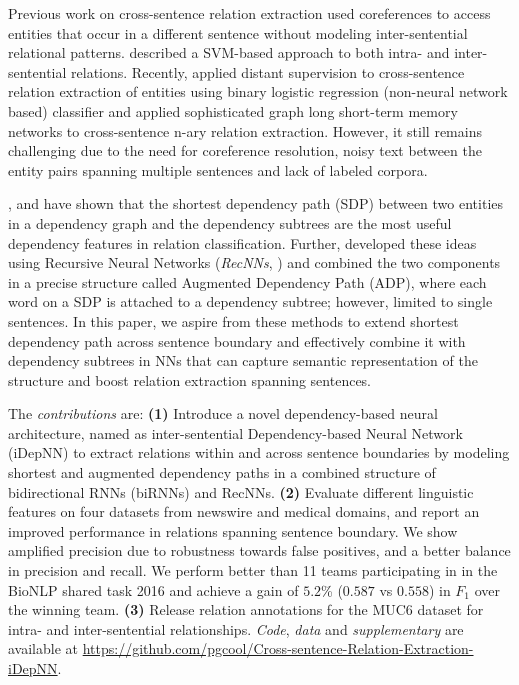 \documentclass[letterpaper]{article} \usepackage{aaai19}  \usepackage{times}  \usepackage{helvet}  \usepackage{courier}  \usepackage{url}  \usepackage{graphicx}
\def\citet#1{\citeauthor{#1} \shortcite{#1}}
\begin{document}
Previous work on cross-sentence relation extraction used
coreferences to access entities that occur in a different
sentence \cite{gerber2010beyond,yoshikawa2011coreference}
without modeling inter-sentential relational patterns. 
\citeauthor{swampillai2011extracting}  described a SVM-based
approach to both intra- and inter-sentential relations.
Recently, \citeauthor{quirk2016distant}  applied distant 
supervision to cross-sentence relation extraction of 
entities using binary logistic regression (non-neural
network based) classifier and \citeauthor{peng2017cross}  applied sophisticated graph long short-term memory networks
to cross-sentence n-ary relation extraction.  However, it
still remains challenging due to the need for coreference
resolution, noisy text between the entity pairs spanning
multiple sentences and lack of labeled corpora.




\citeauthor{bunescu2005shortest} , \citeauthor{nguyen2007relation}  and \citeauthor{mintz:82}  
have shown that the shortest dependency path (SDP)
between two entities in a dependency graph and the dependency subtrees are the most useful dependency features   
in relation classification. 
Further, \citeauthor{liu2015dependency}  developed these ideas using Recursive Neural Networks (\emph{RecNNs}, \citet{socher2014grounded}) and combined the two components in a precise structure called 
Augmented Dependency Path (ADP), where each word on a SDP is attached to a dependency subtree; however, limited to single sentences. 
In this paper, we aspire from these methods to extend shortest dependency path across sentence boundary and effectively combine it with dependency subtrees in NNs that 
can capture semantic representation of the structure and boost relation extraction spanning sentences. 


The {\it contributions} are: 
{\bf (1)} Introduce a novel dependency-based neural architecture, named as inter-sentential Dependency-based Neural Network (iDepNN) 
to extract relations within and across sentence boundaries by modeling shortest and augmented dependency paths 
in a combined structure of bidirectional RNNs (biRNNs) and RecNNs.
{\bf (2)}  Evaluate different linguistic features on four datasets from newswire and  medical domains, and report an improved performance in relations spanning sentence boundary.  
We show amplified precision due to robustness towards false positives, and a better balance in precision and recall. 
We perform better than 11 teams participating in 
in the BioNLP shared task 2016  
and achieve a gain of $5.2$\% ($0.587$ vs $0.558$) in $F_1$ over the winning team.  
{\bf (3)} Release relation annotations for the MUC6 dataset
for intra- and inter-sentential relationships. 
{\it Code}, {\it data} and {\it supplementary} are available at  {\small \url{https://github.com/pgcool/Cross-sentence-Relation-Extraction-iDepNN}}. 
\end{document}
